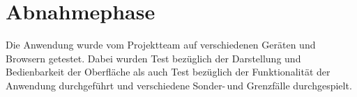 \section{Abnahmephase} 
\label{sec:Abnahmephase}

Die Anwendung wurde vom Projektteam auf verschiedenen Geräten und Browsern getestet. Dabei wurden Test bezüglich der Darstellung und Bedienbarkeit der Oberfläche als auch Test bezüglich der Funktionalität der Anwendung durchgeführt und verschiedene Sonder-\,und Grenzfälle durchgespielt.

